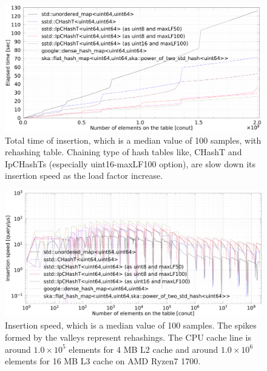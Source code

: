 \begin{figure}[h]
  \includegraphics[scale=0.24]{./fig_bench/insert_et_med.pdf}
  \caption{
    Total time of insertion, which is a median value of 100 samples, with rehashing table.
    Chaining type of hash tables like, CHashT and IpCHashTs (especially uint16-maxLF100 option), are slow down its insertion speed as the load factor increase.
  }
  \label{fig_bench_insert_wRehash}
\end{figure}

\begin{figure}[h]
  \hspace{-3mm}
  \includegraphics[scale=0.24]{./fig_bench/insert_med.pdf}
  \caption{
    Insertion speed, which is a median value of 100 samples.
    The spikes formed by the valleys represent rehashings.
    The CPU cache line is around $1.0\times10^5$ elements for 4 MB L2 cache and around $1.0\times10^6$ elements for 16 MB L3 cache on AMD Ryzen7 1700.
  }
  \label{fig_bench_insert}
\end{figure}


